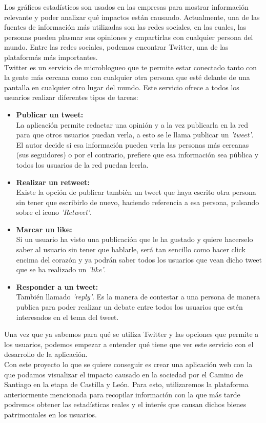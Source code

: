 Los gráficos estadísticos son usados en las empresas para mostrar información relevante y poder analizar qué impactos están causando.
Actualmente, una de las fuentes de información más utilizadas son las redes sociales, en las cuales, las personas pueden plasmar sus opiniones y cmpartirlas con cualquier persona del mundo. Entre las redes sociales, podemos encontrar Twitter, una de las plataformás más importantes.\\
Twitter es un servicio de microblogueo que te permite estar conectado tanto con la gente más cercana como con cualquier otra persona que esté delante de una pantalla en cualquier otro lugar del mundo. 
Este servicio ofrece a todos los usuarios realizar diferentes tipos de tareas:
\begin{itemize}
    \item \textbf{Publicar un tweet:}\\
    La aplicación permite redactar una opinión y a la vez publicarla en la red para que otros usuarios puedan verla, a esto se le llama publicar un \textit{'tweet'}.\\
    El autor decide si esa información pueden verla las personas más cercanas (sus seguidores) o por el contrario, prefiere que esa información sea pública y todos los usuarios de la red puedan leerla.
    \item \textbf{Realizar un retweet:}\\
    Existe la opción de publicar también un tweet que haya escrito otra persona sin tener que escribirlo de nuevo, haciendo referencia a esa persona, pulsando sobre el icono \textit{'Retweet'}.
    \item \textbf{Marcar un like:}\\
    Si un usuario ha visto una publicación que le ha gustado y quiere hacerselo saber al usuario sin tener que hablarle, será tan sencillo como hacer click encima del corazón y ya podrán saber todos los usuarios que vean dicho tweet que se ha realizado un \textit{'like'}.
    \item \textbf{Responder a un tweet:}\\
    También llamado \textit{'reply'}. Es la manera de contestar a una persona de manera publica para poder realizar un debate entre todos los usuarios que estén interesados en el tema del tweet.
\end{itemize}
Una vez que ya sabemos para qué se utiliza Twitter y las opciones que permite a los usuarios, podemos empezar a entender qué tiene que ver este servicio con el desarrollo de la aplicación.\\
Con este proyecto lo que se quiere conseguir es crear una aplicación web con la que podamos visualizar el impacto causado en la sociedad por el Camino de Santiago en la etapa de Castilla y León. Para esto, utilizaremos la plataforma anteriormente mencionada para recopilar información con la que más tarde podremos obtener las estadísticas reales y el interés que causan dichos bienes patrimoniales en los usuarios.
